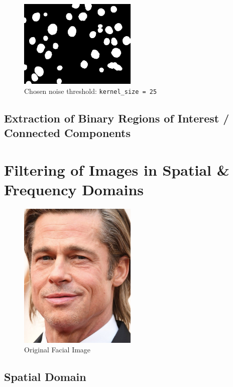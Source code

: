 \documentclass[a4paper]{article}
\newenvironment{code}{\captionsetup{type=listing}}{}
\begin{document}
\begin{figure}[H]
    \centering
    \includegraphics[width=0.5\textwidth]{../code/task1/output/kernel_size_25.jpg}
    \caption{Chosen noise threshold: \texttt{kernel_size = 25}}
\end{figure}

\subsection{Extraction of Binary Regions of Interest / Connected Components}

\newpage

\section{Filtering of Images in Spatial \& Frequency Domains}
\begin{figure}[H]
    \centering
    \includegraphics[width=0.5\textwidth]{../Task2.jpg}
    \caption{Original Facial Image}
\end{figure}

\subsection{Spatial Domain}
\begin{code}
\inputminted[firstline=5, lastline=13, linenos, breaklines, frame=single]{python}{../code/task2/task2.py}
\caption{Task 2.1 section of \texttt{task2.py}}
\end{code}
\end{document}
